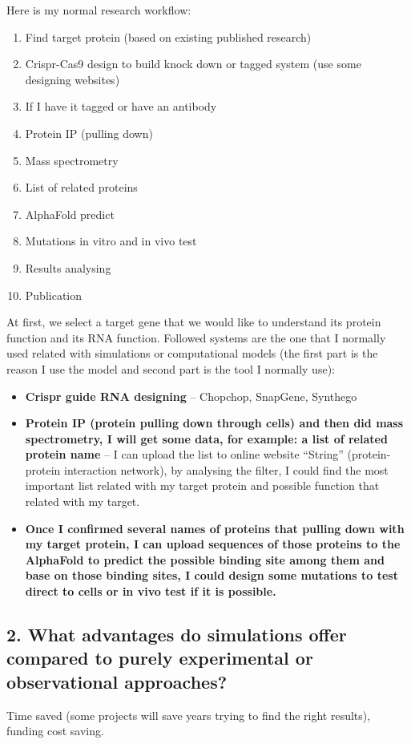 Here is my normal research workflow:

\begin{enumerate}
    \item Find target protein (based on existing published research)
    \item Crispr-Cas9 design to build knock down or tagged system (use some designing websites)
    \item If I have it tagged or have an antibody
    \item Protein IP (pulling down)
    \item Mass spectrometry
    \item List of related proteins
    \item AlphaFold predict
    \item Mutations in vitro and in vivo test
    \item Results analysing
    \item Publication
\end{enumerate}

At first, we select a target gene that we would like to understand its protein function and its RNA function. Followed systems are the one that I normally used related with simulations or computational models (the first part is the reason I use the model and second part is the tool I normally use):

\begin{itemize}
    \item \textbf{Crispr guide RNA designing} -- Chopchop, SnapGene, Synthego
    \item \textbf{Protein IP (protein pulling down through cells) and then did mass spectrometry, I will get some data, for example: a list of related protein name} -- I can upload the list to online website ``String'' (protein-protein interaction network), by analysing the filter, I could find the most important list related with my target protein and possible function that related with my target.
    \item \textbf{Once I confirmed several names of proteins that pulling down with my target protein, I can upload sequences of those proteins to the AlphaFold to predict the possible binding site among them and base on those binding sites, I could design some mutations to test direct to cells or in vivo test if it is possible.}
\end{itemize}

\subsection*{2. What advantages do simulations offer compared to purely experimental or observational approaches?}
Time saved (some projects will save years trying to find the right results), funding cost saving.

